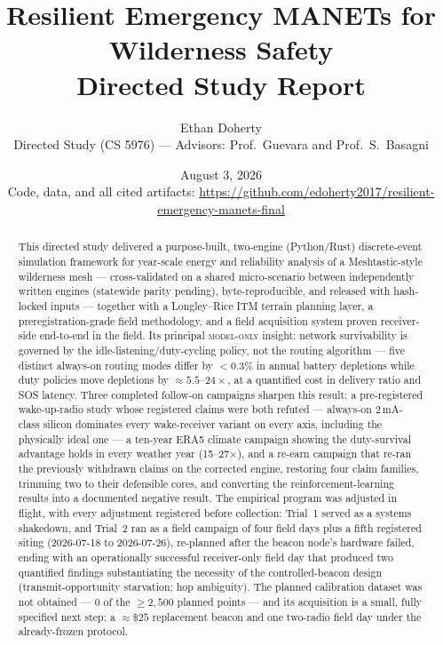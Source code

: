 \documentclass[11pt]{article}
\title{\textbf{Resilient Emergency MANETs for Wilderness Safety}\\[4pt]
\large Directed Study Report}
\author{Ethan Doherty\\\small Directed Study (CS 5976) --- Advisors: Prof.~Guevara and Prof.~S.~Basagni}
\date{August 3, 2026\\[3pt]
\small Code, data, and all cited artifacts:
\url{https://github.com/edoherty2017/resilient-emergency-manets-final}}
\newcommand{\modelonly}{\textsc{model-only}}
\begin{document}
\maketitle

\begin{abstract}
\noindent This directed study delivered a purpose-built, two-engine
(Python/Rust) discrete-event simulation framework for year-scale energy and
reliability analysis of a Meshtastic-style wilderness mesh --- cross-validated on a shared micro-scenario between independently written engines (statewide parity pending), byte-reproducible, and released with hash-locked inputs --- together with a Longley--Rice ITM terrain planning
layer, a preregistration-grade field methodology, and a field acquisition system proven receiver-side end-to-end in the field. Its principal \modelonly{} insight:
network survivability is governed by the idle-listening/duty-cycling policy,
not the routing algorithm --- five distinct always-on routing modes differ by
$<0.3\%$ in annual battery depletions while duty policies move depletions by
${\approx}5.5$--$24\times$, at a quantified cost in delivery ratio and SOS
latency. Three completed follow-on campaigns sharpen this result: a
pre-registered wake-up-radio study whose registered claims were both refuted
--- always-on 2\,mA-class silicon dominates every wake-receiver variant on
every axis, including the physically ideal one --- a ten-year ERA5 climate
campaign showing the duty-survival advantage holds in every weather year
(15--27$\times$), and a re-earn campaign that re-ran the previously
withdrawn claims on the corrected engine, restoring four claim families,
trimming two to their defensible cores, and converting the reinforcement-learning
results into a documented negative result. The empirical program was adjusted in flight, with every adjustment
registered before collection: Trial~1 served as a systems shakedown, and
Trial~2 ran as a field campaign of four field days plus a fifth registered
siting (2026-07-18 to 2026-07-26), re-planned after the beacon node's
hardware failed, ending with an operationally successful receiver-only field
day that produced two quantified findings substantiating the necessity of the controlled-beacon design (transmit-opportunity starvation; hop ambiguity). The planned
calibration dataset was not obtained --- 0 of the ${\geq}2{,}500$ planned points --- and its acquisition is a small, fully specified next step: a
${\approx}\$25$ replacement beacon and one two-radio field day under the
already-frozen protocol.
\end{abstract}
\end{document}
